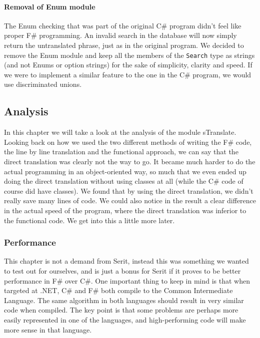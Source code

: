 \documentclass[12pt, a4paper]{article}
\newcommand{\code}[1]{{\small \texttt{#1}}}
\begin{document}
\paragraph{Removal of Enum module} The Enum checking that was part of the original C\# program didn't feel like proper F\# programming. An invalid search in the database will now simply return the untranslated phrase, just as in the original program. We decided to remove the Enum module and keep all the members of the \code{Search} type as strings (and not Enums or option strings) for the sake of simplicity, clarity and speed. If we were to implement a similar feature to the one in the C\# program, we would use discriminated unions.

\newpage


\subsection{Analysis}
In this chapter we will take a look at the analysis of the module sTranslate.
Looking back on how we used the two different methods of writing the F\# code, the line by line translation and the functional approach, we can say that the direct translation was clearly not the way to go. It became much harder to do the actual programming in an object-oriented way, so much that we even ended up doing the direct translation without using classes at all (while the C\# code of course did have classes). We found that by using the direct translation, we didn't really save many lines of code. We could also notice in the result a clear difference in the actual speed of the program, where the direct translation was inferior to the functional code. We get into this a little more later.

\subsubsection{Performance}
\label{sTranslatePerformance}
This chapter is not a demand from Serit, instead this was something we wanted to test out for ourselves, and is just a bonus for Serit if it proves to be better performance in F\# over C\#. One important thing to keep in mind is that when targeted at .NET, C\# and F\# both compile to the Common Intermediate Language. The same algorithm in both languages should result in very similar code when compiled. The key point is that some problems are perhaps more easily represented in one of the languages, and high-performing code will make more sense in that language.\\
\end{document}

